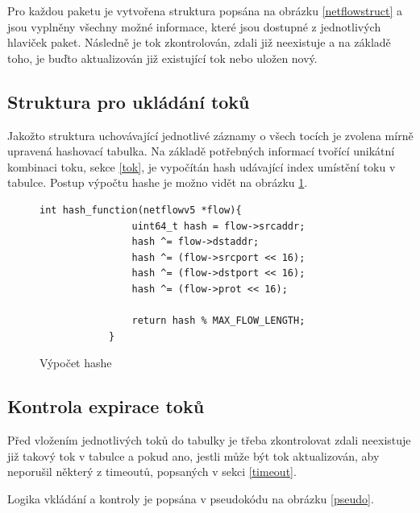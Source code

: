 \documentclass[11pt, a4paper, hidelinks]{article}[08.10.2023]
\begin{document}
    Pro každou paketu je vytvořena struktura popsána na obrázku \ref{netflowstruct} a jsou vyplněny všechny možné informace, které jsou dostupné z jednotlivých hlaviček paket. Následně je tok zkontrolován, zdali již neexistuje a na základě toho, je buďto aktualizován již existující tok nebo uložen nový.

    \subsection{Struktura pro ukládání toků}
    Jakožto struktura uchovávající jednotlivé záznamy o všech tocích je zvolena mírně upravená hashovací tabulka. Na základě potřebných informací tvořící unikátní kombinaci toku, sekce \ref{tok}, je vypočítán hash udávající index umístění toku v tabulce. Postup výpočtu hashe je možno vidět na obrázku \ref{hash}.

     \begin{figure}[h!]
        \centering
        \begin{lstlisting}[style=CStyle]
            int hash_function(netflowv5 *flow){
                uint64_t hash = flow->srcaddr;
                hash ^= flow->dstaddr;
                hash ^= (flow->srcport << 16);
                hash ^= (flow->dstport << 16);
                hash ^= (flow->prot << 16);
            
                return hash % MAX_FLOW_LENGTH;
            }
        \end{lstlisting}
        \caption{Výpočet hashe}
        \label{hash}
    \end{figure}

    \subsection{Kontrola expirace toků}\label{kontrola}
    Před vložením jednotlivých toků do tabulky je třeba zkontrolovat zdali neexistuje již takový tok v tabulce a pokud ano, jestli může být tok aktualizován, aby neporušil některý z timeoutů, popsaných v sekci \ref{timeout}.

    Logika vkládání a kontroly je popsána v pseudokódu na obrázku \ref{pseudo}.
\end{document}

